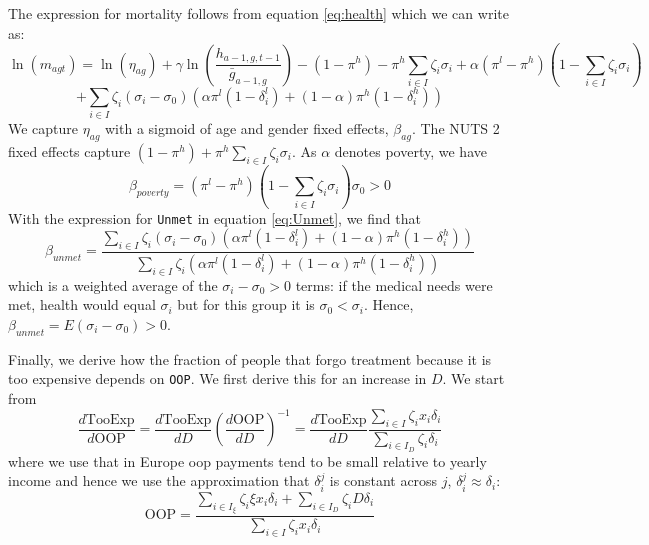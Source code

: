 \documentclass[a4paper,12pt]{article}
\begin{document}
The expression for mortality follows from equation \eqref{eq:health} which we can write as:
\begin{equation}
\ln(m_{agt}) = \ln({\eta}_{ag}) + \gamma \ln \left( \frac{h_{a-1,g,t-1}}{\bar g_{a-1,g}}\right)- (1-\pi^h)-\pi^h \sum_{i \in I} \zeta_i \sigma_i + \alpha (\pi^l-\pi^h)(1-\sum_{i \in I} \zeta_i \sigma_i)
 \end{equation}
\begin{equation*}
+ \sum_{i \in I} \zeta_i (\sigma_i-\sigma_0) (\alpha \pi^l (1-\delta_i^l) + (1-\alpha) \pi^h (1-\delta_i^h))
\end{equation*}
We capture \({\eta}_{ag}\) with a sigmoid of age and gender fixed effects, \(\beta_{ag}\). The NUTS 2 fixed effects capture \((1-\pi^h)+\pi^h \sum_{i \in I} \zeta_i \sigma_i\). As \(\alpha\) denotes poverty, we have
\begin{equation}
\beta_{poverty} = (\pi^l-\pi^h)(1-\sum_{i \in I} \zeta_i \sigma_i) \sigma_0 > 0
\end{equation}
With the expression for \texttt{Unmet} in equation \eqref{eq:Unmet}, we find that
\begin{equation}
\beta_{unmet} = \frac{\sum_{i \in I} \zeta_i (\sigma_i-\sigma_0) (\alpha \pi^l (1-\delta_i^l) + (1-\alpha) \pi^h (1-\delta_i^h))}{\sum_{i \in I} \zeta_i (\alpha \pi^l (1-\delta_i^l) + (1-\alpha) \pi^h (1-\delta_i^h))}
\end{equation}
which is a weighted average of the \(\sigma_i-\sigma_0>0\) terms: if the medical needs were met, health would equal \(\sigma_i\) but for this group it is \(\sigma_0 < \sigma_{i}\). Hence, \(\beta_{unmet} = E(\sigma_i-\sigma_0)>0\).

Finally, we derive how the fraction of people that forgo treatment because it is too expensive depends on \texttt{OOP}. We first derive this for an increase in \(D\). We start from
\begin{equation}
\label{eq:TooExp_OOP}
\frac{d \text{TooExp}}{d \text{OOP}} = \frac{d \text{TooExp}}{dD} \left( \frac{d \text{OOP}}{d D}
  \right)^{-1} = \frac{d \text{TooExp}}{dD} \frac{\sum_{i \in I} \zeta_i x_i \delta_i}{\sum_{i \in I_D} \zeta_i \delta_i}
\end{equation}
where we use that in Europe oop payments tend to be small relative to yearly income and hence we use the approximation that \(\delta^j_i\) is constant across \(j\), \(\delta^{j}_i \approx \delta_{i}\):
\begin{equation}
\label{eq:OOP2_app}
\text{OOP} = \frac{\sum_{i \in I_{\xi}} \zeta_i \xi x_i \delta_i+ \sum_{i \in I_D} \zeta_i D \delta_i}{\sum_{i \in I} \zeta_i x_i \delta_i}
\end{equation}
\end{document}

